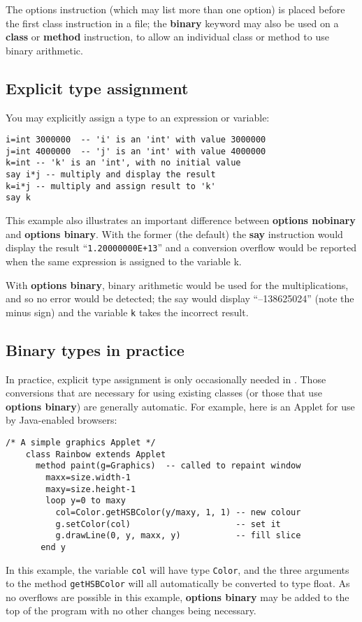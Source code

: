 The options instruction (which may list more than one option) is placed before the first class instruction in a file; the \textbf{binary} keyword may also be used on a \textbf{class} or \textbf{method} instruction, to allow an individual class or method to use binary arithmetic.
\subsection{Explicit type assignment}
You may explicitly assign a type to an expression or variable:
\begin{lstlisting}[label=assigningtype,caption=Assigning Type]
i=int 3000000  -- 'i' is an 'int' with value 3000000
j=int 4000000  -- 'j' is an 'int' with value 4000000
k=int -- 'k' is an 'int', with no initial value
say i*j -- multiply and display the result
k=i*j -- multiply and assign result to 'k'
say k
\end{lstlisting}
This example also illustrates an important difference between
\textbf{options nobinary} and \textbf{options binary}. With the former
(the default) the \textbf{say} instruction would display the result
“\texttt{1.20000000E+13}” and a conversion overflow would be reported
when the same expression is assigned to the variable k.

With \textbf{options binary}, binary arithmetic would be used for the
multiplications, and so no error would be detected; the say would
display “–138625024” (note the minus sign) and the variable \texttt{k} takes the incorrect result.
\subsection{Binary types in practice}
In practice, explicit type assignment is only occasionally needed in
\nr{}. Those conversions that are necessary for using existing
classes (or those that use \textbf{options binary}) are generally
automatic. For example, here is an Applet for use by Java-enabled
browsers:
\begin{lstlisting}[label=asimpleapplet,caption=A Simple Applet]
    /* A simple graphics Applet */
    class Rainbow extends Applet
      method paint(g=Graphics)  -- called to repaint window
        maxx=size.width-1
        maxy=size.height-1
        loop y=0 to maxy
          col=Color.getHSBColor(y/maxy, 1, 1) -- new colour
          g.setColor(col)                     -- set it
          g.drawLine(0, y, maxx, y)           -- fill slice
       end y
\end{lstlisting}
In this example, the variable \texttt{col} will have type \texttt{Color}, and the three
arguments to the method \texttt{getHSBColor} will all automatically be
converted to type float. As no overflows are possible in this example,
\textbf{options binary} may be added to the top of the program with no other
changes being necessary.

